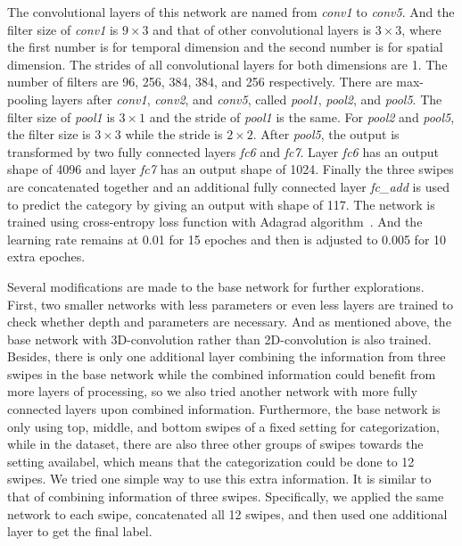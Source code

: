 The convolutional layers of this network are named from \textit{conv1} to \textit{conv5}.
And the filter size of \textit{conv1} is $9\times3$ and that of other convolutional layers is $3\times3$, where the first number is for temporal dimension and the second number is for spatial dimension.
The strides of all convolutional layers for both dimensions are 1. The number of filters are 96, 256, 384, 384, and 256 respectively.
There are max-pooling layers after \textit{conv1}, \textit{conv2}, and \textit{conv5}, called \textit{pool1}, \textit{pool2}, and \textit{pool5}. The filter size of \textit{pool1} is $3\times1$ and the stride of \textit{pool1} is the same.
For \textit{pool2} and \textit{pool5}, the filter size is $3\times3$ while the stride is $2\times2$.
After \textit{pool5}, the output is transformed by two fully connected layers \textit{fc6} and \textit{fc7}. Layer \textit{fc6} has an output shape of 4096 and layer \textit{fc7} has an output shape of 1024.
Finally the three swipes are concatenated together and an additional fully connected layer \textit{fc\_add} is used to predict the category by giving an output with shape of 117.
The network is trained using cross-entropy loss function with Adagrad algorithm~\cite{duchi2011adaptive}.
And the learning rate remains at 0.01 for 15 epoches and then is adjusted to 0.005 for 10 extra epoches.


Several modifications are made to the base network for further explorations. First, two smaller networks with less parameters or even less layers are trained to check whether depth and parameters are necessary.
And as mentioned above, the base network with 3D-convolution rather than 2D-convolution is also trained.
Besides, there is only one additional layer combining the information from three swipes in the base network while the combined information could benefit from more layers of processing, so we also tried another network with more fully connected layers upon combined information.
Furthermore, the base network is only using top, middle, and bottom swipes of a fixed setting for categorization, while in the dataset, there are also three other groups of swipes towards the setting availabel, which means that the categorization could be done to 12 swipes. 
We tried one simple way to use this extra information. It is similar to that of combining information of three swipes. Specifically, we applied the same network to each swipe, concatenated all 12 swipes, and then used one additional layer to get the final label.



